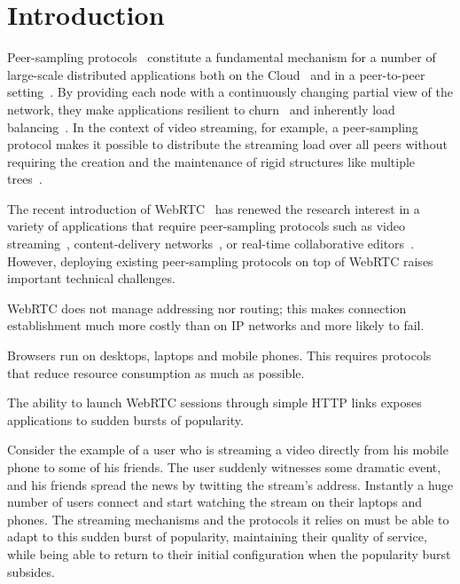 
\section{Introduction}

Peer-sampling
protocols~\cite{jelasity2007gossip,tolgyeski2009adaptive,voulgaris2005cyclon}
constitute a fundamental mechanism for a number of large-scale distributed
applications both on the Cloud~\cite{decandia2007dynamo} and in a peer-to-peer
setting~\cite{Frey09Middleware,voulgaris2005sub,wuhib2009robust}. By providing
each node with a continuously changing partial view of the network, they make
applications resilient to churn~\cite{bertier-d2ht} and inherently load
balancing~\cite{Frey09DSN}. In the context of video streaming, for example, a
peer-sampling protocol makes it possible to distribute the streaming load over
all peers without requiring the creation and the maintenance of rigid structures
like multiple trees~\cite{Frey09DSN,monod:THESIS}.

The recent introduction of WebRTC~\cite{webrtc} has renewed the
research interest in a variety of applications that require
peer-sampling protocols such as video streaming~\cite{hivejs,smoothcache2},
content-delivery networks~\cite{Zhang:2013:MBC:2465351.2465379}, or
real-time collaborative editors~\cite{nedelec2016crate}. However,
deploying existing peer-sampling protocols on top of WebRTC raises
important technical challenges.
\begin{inparaenum}[(1)]
\item WebRTC does not manage addressing nor routing; this makes
  connection establishment much more costly than on IP networks and
  more likely to fail. 
\item Browsers run on desktops, laptops and mobile phones. This
  requires protocols that reduce resource consumption as much as
  possible.
\item The ability to launch WebRTC sessions through simple HTTP links
  exposes applications to sudden bursts of popularity.
\end{inparaenum}
Consider the example of a user who is streaming a video directly from
his mobile phone to some of his friends. The user suddenly witnesses
some dramatic event, and his friends spread the news by twitting the
stream's address. Instantly a huge number of users connect and start
watching the stream on their laptops and phones. The streaming
mechanisms and the protocols it relies on must be able to adapt to
this sudden burst of popularity, maintaining their quality of service,
while being able to return to their initial configuration when the
popularity burst subsides. 

